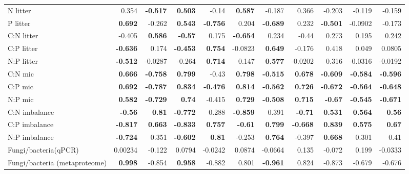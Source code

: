 \documentclass[10pt]{article}
\begin{document}
\begin{flushleft}
\begin{landscape}
\begin{table}[h!]
\begin{center}
{\begin{tabular}{lrrrrrrrrrr}
  N litter & 0.354 & \textbf{ -0.517 } & \textbf{ 0.503 } & -0.14 & \textbf{ 0.587 } & -0.187 & 0.366 & -0.203 & -0.119 & -0.159 \\ 
  P litter & \textbf{ 0.692 } & -0.262 & \textbf{ 0.543 } & \textbf{ -0.756 } & 0.204 & \textbf{ -0.689 } & 0.232 & \textbf{ -0.501 } & -0.0902 & -0.173 \\ 
  C:N litter & -0.405 & \textbf{ 0.586 } & \textbf{ -0.57 } & 0.175 & \textbf{ -0.654 } & 0.234 & -0.44 & 0.273 & 0.195 & 0.242 \\ 
  C:P litter & \textbf{ -0.636 } & 0.174 & \textbf{ -0.453 } & \textbf{ 0.754 } & -0.0823 & \textbf{ 0.649 } & -0.176 & 0.418 & 0.049 & 0.0805 \\ 
  N:P litter & \textbf{ -0.512 } & -0.0287 & -0.264 & \textbf{ 0.714 } & 0.147 & \textbf{ 0.577 } & -0.0202 & 0.316 & -0.0316 & -0.0192 \\ 
  C:N mic & \textbf{ 0.666 } & \textbf{ -0.758 } & \textbf{ 0.799 } & -0.43 & \textbf{ 0.798 } & \textbf{ -0.515 } & \textbf{ 0.678 } & \textbf{ -0.609 } & \textbf{ -0.584 } & \textbf{ -0.596 } \\ 
  C:P mic & \textbf{ 0.692 } & \textbf{ -0.787 } & \textbf{ 0.834 } & \textbf{ -0.476 } & \textbf{ 0.814 } & \textbf{ -0.562 } & \textbf{ 0.726 } & \textbf{ -0.672 } & \textbf{ -0.564 } & \textbf{ -0.648 } \\ 
  N:P mic & \textbf{ 0.582 } & \textbf{ -0.729 } & \textbf{ 0.74 } & -0.415 & \textbf{ 0.729 } & \textbf{ -0.508 } & \textbf{ 0.715 } & \textbf{ -0.67 } & \textbf{ -0.545 } & \textbf{ -0.671 } \\ 
  C:N imbalance & \textbf{ -0.56 } & \textbf{ 0.81 } & \textbf{ -0.772 } & 0.288 & \textbf{ -0.859 } & 0.391 & \textbf{ -0.71 } & \textbf{ 0.531 } & \textbf{ 0.564 } & \textbf{ 0.56 } \\ 
  C:P imbalance & \textbf{ -0.817 } & \textbf{ 0.663 } & \textbf{ -0.833 } & \textbf{ 0.757 } & \textbf{ -0.61 } & \textbf{ 0.799 } & \textbf{ -0.668 } & \textbf{ 0.839 } & \textbf{ 0.575 } & \textbf{ 0.67 } \\ 
  N:P imbalance & \textbf{ -0.724 } & 0.351 & \textbf{ -0.602 } & \textbf{ 0.81 } & -0.253 & \textbf{ 0.764 } & -0.397 & \textbf{ 0.668 } & 0.301 & 0.41 \\ 
  Fungi/bacteria(qPCR) & 0.00234 & -0.122 & 0.0794 & -0.0242 & 0.0874 & -0.0664 & 0.135 & -0.072 & 0.199 & -0.0333 \\ 
  Fungi/bacteria (metaproteome) & \textbf{ 0.998 } & -0.854 & \textbf{ 0.958 } & -0.882 & 0.801 & \textbf{ -0.961 } & 0.824 & -0.873 & -0.679 & -0.676 \\ 

\end{tabular}}
\end{center}
\end{table}
\end{landscape}
\end{flushleft}
\end{document}

